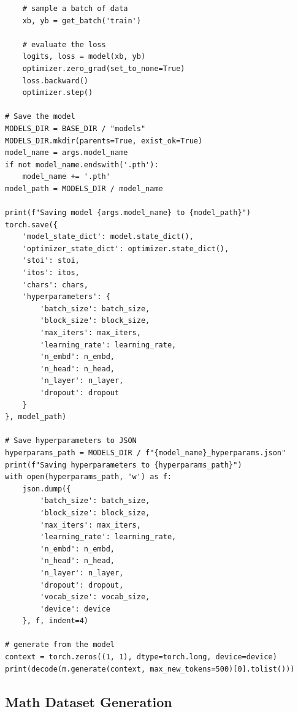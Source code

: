 \begin{verbatim}
    # sample a batch of data
    xb, yb = get_batch('train')

    # evaluate the loss
    logits, loss = model(xb, yb)
    optimizer.zero_grad(set_to_none=True)
    loss.backward()
    optimizer.step()

# Save the model
MODELS_DIR = BASE_DIR / "models"
MODELS_DIR.mkdir(parents=True, exist_ok=True)
model_name = args.model_name
if not model_name.endswith('.pth'):
    model_name += '.pth'
model_path = MODELS_DIR / model_name

print(f"Saving model {args.model_name} to {model_path}")
torch.save({
    'model_state_dict': model.state_dict(),
    'optimizer_state_dict': optimizer.state_dict(),
    'stoi': stoi,
    'itos': itos,
    'chars': chars,
    'hyperparameters': {
        'batch_size': batch_size,
        'block_size': block_size,
        'max_iters': max_iters,
        'learning_rate': learning_rate,
        'n_embd': n_embd,
        'n_head': n_head,
        'n_layer': n_layer,
        'dropout': dropout
    }
}, model_path)

# Save hyperparameters to JSON
hyperparams_path = MODELS_DIR / f"{model_name}_hyperparams.json"
print(f"Saving hyperparameters to {hyperparams_path}")
with open(hyperparams_path, 'w') as f:
    json.dump({
        'batch_size': batch_size,
        'block_size': block_size,
        'max_iters': max_iters,
        'learning_rate': learning_rate,
        'n_embd': n_embd,
        'n_head': n_head,
        'n_layer': n_layer,
        'dropout': dropout,
        'vocab_size': vocab_size,
        'device': device
    }, f, indent=4)

# generate from the model
context = torch.zeros((1, 1), dtype=torch.long, device=device)
print(decode(m.generate(context, max_new_tokens=500)[0].tolist()))
\end{verbatim}


\subsection{Math Dataset Generation}

